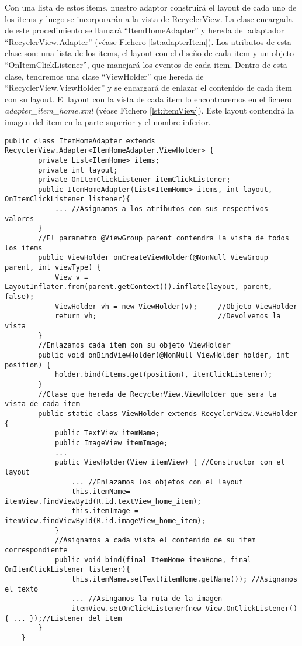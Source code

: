 Con una lista de estos items, nuestro adaptor construirá el layout de cada uno de los items y luego se incorporarán a la vista de RecyclerView. La clase encargada de este procedimiento se llamará ``ItemHomeAdapter'' y hereda del adaptador ``RecyclerView.Adapter'' (véase Fichero \ref{lst:adapterItem}). Los atributos de esta clase son: una lista de los items, el layout con el diseño de cada item y un objeto ``OnItemClickListener'', que manejará los eventos de cada item. Dentro de esta clase, tendremos una clase ``ViewHolder'' que hereda de ``RecyclerView.ViewHolder'' y se encargará de enlazar el contenido de cada item con su layout. El layout con la vista de cada item lo encontraremos en el fichero \textit{adapter\_item\_home.xml} (véase Fichero \ref{lst:itemView}). Este layout contendrá la imagen del item en la parte superior y el nombre inferior.
     
\begin{lstlisting}[caption={Fichero \textit{ItemHomeAdapter.java}, clase que contruye las vistas de los items.},  label={lst:adapterItem}]
    public class ItemHomeAdapter extends RecyclerView.Adapter<ItemHomeAdapter.ViewHolder> {
        private List<ItemHome> items;
        private int layout;
        private OnItemClickListener itemClickListener;
        public ItemHomeAdapter(List<ItemHome> items, int layout, OnItemClickListener listener){
            ... //Asignamos a los atributos con sus respectivos valores
        }
        //El parametro @ViewGroup parent contendra la vista de todos los items
        public ViewHolder onCreateViewHolder(@NonNull ViewGroup parent, int viewType) {
            View v = LayoutInflater.from(parent.getContext()).inflate(layout, parent, false);
            ViewHolder vh = new ViewHolder(v);     //Objeto ViewHolder  
            return vh;                             //Devolvemos la vista    
        }
        //Enlazamos cada item con su objeto ViewHolder
        public void onBindViewHolder(@NonNull ViewHolder holder, int position) {
            holder.bind(items.get(position), itemClickListener);
        }
        //Clase que hereda de RecyclerView.ViewHolder que sera la vista de cada item
        public static class ViewHolder extends RecyclerView.ViewHolder { 
            public TextView itemName;     
            public ImageView itemImage;   
            ...
            public ViewHolder(View itemView) { //Constructor con el layout
                ... //Enlazamos los objetos con el layout
                this.itemName= itemView.findViewById(R.id.textView_home_item);     
                this.itemImage = itemView.findViewById(R.id.imageView_home_item);
            }
            //Asignamos a cada vista el contenido de su item correspondiente 
            public void bind(final ItemHome itemHome, final OnItemClickListener listener){
                this.itemName.setText(itemHome.getName()); //Asignamos el texto
                ... //Asingamos la ruta de la imagen
                itemView.setOnClickListener(new View.OnClickListener() { ... });//Listener del item
        }
    }
\end{lstlisting}
    
